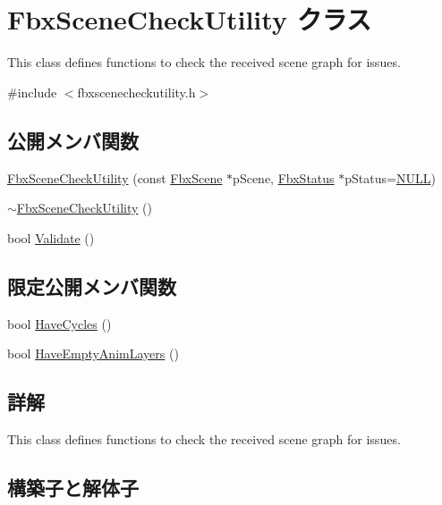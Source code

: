 \hypertarget{class_fbx_scene_check_utility}{}\section{Fbx\+Scene\+Check\+Utility クラス}
\label{class_fbx_scene_check_utility}


This class defines functions to check the received scene graph for issues.  




{\ttfamily \#include $<$fbxscenecheckutility.\+h$>$}

\subsection*{公開メンバ関数}
\begin{DoxyCompactItemize}
\item 
\hyperlink{class_fbx_scene_check_utility_ab5c3ab98b92bbf769e6dc0dbefd7812d}{Fbx\+Scene\+Check\+Utility} (const \hyperlink{class_fbx_scene}{Fbx\+Scene} $\ast$p\+Scene, \hyperlink{class_fbx_status}{Fbx\+Status} $\ast$p\+Status=\hyperlink{fbxarch_8h_a070d2ce7b6bb7e5c05602aa8c308d0c4}{N\+U\+LL})
\item 
\hyperlink{class_fbx_scene_check_utility_ac626dec2f6a4f4584e4a914ce9a68226}{$\sim$\+Fbx\+Scene\+Check\+Utility} ()
\item 
bool \hyperlink{class_fbx_scene_check_utility_a1ab351d6f370393663719a46ee4b6eff}{Validate} ()
\end{DoxyCompactItemize}
\subsection*{限定公開メンバ関数}
\begin{DoxyCompactItemize}
\item 
bool \hyperlink{class_fbx_scene_check_utility_a3998b242e9585b74917e7cd081dd9a5e}{Have\+Cycles} ()
\item 
bool \hyperlink{class_fbx_scene_check_utility_aca14381c6153cbfe485198f7f5e378ab}{Have\+Empty\+Anim\+Layers} ()
\end{DoxyCompactItemize}


\subsection{詳解}
This class defines functions to check the received scene graph for issues. 

\subsection{構築子と解体子}
\mbox{\label{class_fbx_scene_check_utility_ab5c3ab98b92bbf769e6dc0dbefd7812d}} 

